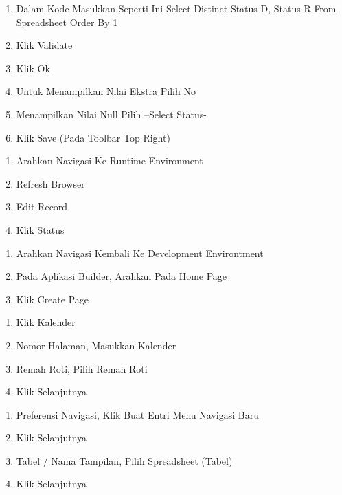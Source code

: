 \documentclass{article}
\begin{document}
\begin{enumerate}
    \item Dalam Kode Masukkan Seperti Ini
Select Distinct Status D, Status R From Spreadsheet Order By 1
\item Klik Validate
\item Klik Ok
\item Untuk Menampilkan Nilai Ekstra Pilih No
\item Menampilkan Nilai Null Pilih –Select Status-
\item Klik Save (Pada Toolbar Top Right)\\

\end{enumerate}
\begin{enumerate}
    \item Arahkan Navigasi Ke Runtime Environment
    \item Refresh Browser
    \item Edit Record
    \item Klik Status\\

\end{enumerate}

\begin{enumerate}
    \item Arahkan Navigasi Kembali Ke Development Environtment
    \item Pada Aplikasi Builder, Arahkan Pada Home Page
    \item Klik Create Page\\

\end{enumerate}

\begin{enumerate}
    \item Klik Kalender
    \item Nomor Halaman, Masukkan Kalender
    \item Remah Roti, Pilih Remah Roti
    \item Klik Selanjutnya\\

\end{enumerate}

\begin{enumerate}
    \item Preferensi Navigasi, Klik Buat Entri Menu Navigasi Baru
    \item Klik Selanjutnya
    \item Tabel / Nama Tampilan, Pilih Spreadsheet (Tabel)
    \item Klik Selanjutnya

\end{enumerate}
\end{document}
